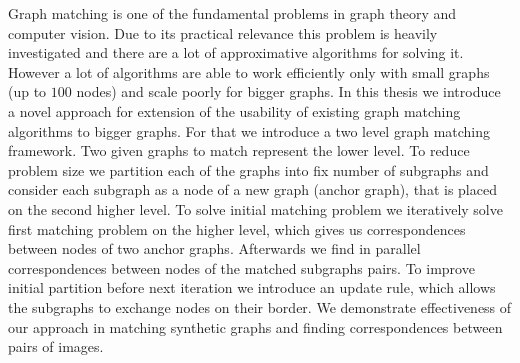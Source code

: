Graph matching is one of the fundamental problems in graph theory and computer vision. Due to its practical relevance this problem is heavily investigated and there are a lot of approximative algorithms for solving it.
However a lot of algorithms are able to work efficiently only with small graphs (up to $100$ nodes) and scale poorly for bigger graphs. In this thesis we introduce a novel approach for extension of the usability of existing graph matching algorithms to bigger graphs. For that we introduce a two level graph matching framework. Two given graphs to match represent the lower level. To reduce problem size we partition each of the graphs into fix number of subgraphs and consider each subgraph as a node of a new graph (anchor graph), that is placed on the second higher level. To solve initial matching problem we iteratively solve first matching problem on the higher level, which gives us correspondences between nodes of two anchor graphs. Afterwards we find in parallel correspondences between nodes of the matched subgraphs pairs. To improve initial partition before next iteration we introduce an update rule, which allows the subgraphs to exchange nodes on their border. We demonstrate effectiveness of our approach in matching synthetic graphs and finding correspondences between pairs of images.